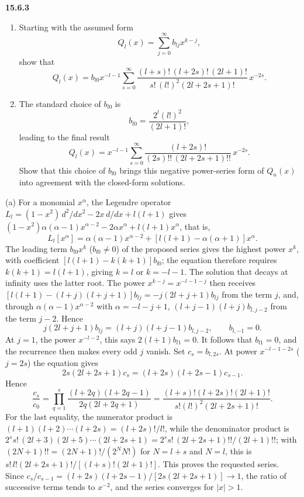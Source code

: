 \par\bigskip
\noindent\textbf{15.6.3}
\begin{enumerate}
\item[(a)]  Starting with the assumed form
\[
Q_{l}(x)=\sum_{j=0}^{\infty}b_{lj}x^{k-j},
\]
show that
\[
Q_{l}(x)=b_{l0}x^{-l-1}\sum_{s=0}^{\infty}
\frac{(l+s)!\,(l+2s)!\,(2l+1)!}{s!\,(l!)^{2}(2l+2s+1)!}\,x^{-2s}.
\]
\item[(b)] The standard choice of $b_{l0}$ is
\[
b_{l0}=\frac{2^{l}(l!)^{2}}{(2l+1)!},
\]
leading to the final result
\[
Q_{l}(x)=x^{-l-1}\sum_{s=0}^{\infty}
\frac{(l+2s)!}{(2s)!!\,(2l+2s+1)!!}\,x^{-2s}.
\]
Show that this choice of $b_{l0}$ brings this negative power-series
form of $Q_{n}(x)$ into agreement with the closed-form solutions.
\end{enumerate}
\solution
(a) For a monomial $x^\alpha$, the Legendre operator
$L_l=(1-x^2)\,d^2/dx^2-2x\,d/dx+l(l+1)$ gives
$(1-x^2)\alpha(\alpha-1)x^{\alpha-2}-2\alpha x^\alpha+l(l+1)x^\alpha$,
that is,
\[
L_l[x^\alpha]=\alpha(\alpha-1)x^{\alpha-2}
+[l(l+1)-\alpha(\alpha+1)]x^\alpha.
\]
The leading term $b_{l0}x^k$ ($b_{l0}\ne0$) of the proposed series
gives the highest power $x^k$, with coefficient
$[l(l+1)-k(k+1)]b_{l0}$; the equation therefore requires
$k(k+1)=l(l+1)$, giving $k=l$ or $k=-l-1$.
The solution that decays at infinity uses the latter root.
The power $x^{k-j}=x^{-l-1-j}$ then receives
$[l(l+1)-(l+j)(l+j+1)]b_{lj}=-j(2l+j+1)b_{lj}$ from the term $j$, and,
through $\alpha(\alpha-1)x^{\alpha-2}$ with $\alpha=-l-j+1$,
$(l+j-1)(l+j)b_{l,j-2}$ from the term $j-2$. Hence
\[
j(2l+j+1)b_{lj}=(l+j)(l+j-1)b_{l,j-2},\qquad b_{l,-1}=0.
\]
At $j=1$, the power $x^{-l-2}$, this says
$2(l+1)b_{l1}=0$.
It follows that $b_{l1}=0$, and the recurrence then makes every
odd $j$ vanish. Set $c_s=b_{l,2s}$.
At power $x^{-l-1-2s}$ ($j=2s$) the equation gives
\[
2s(2l+2s+1)c_s=(l+2s)(l+2s-1)c_{s-1}.
\]
Hence
\[
\frac{c_s}{c_0}
=\prod_{q=1}^s\frac{(l+2q)(l+2q-1)}{2q(2l+2q+1)}
=\frac{(l+s)!(l+2s)!(2l+1)!}
{s!(l!)^2(2l+2s+1)!}.
\]
For the last equality, the numerator product is
$(l+1)(l+2)\cdots(l+2s)=(l+2s)!/l!$,
while the denominator product is
$2^ss!\,(2l+3)(2l+5)\cdots(2l+2s+1)=2^ss!\,(2l+2s+1)!!/(2l+1)!!$;
with $(2N+1)!!=(2N+1)!/(2^NN!)$ for $N=l+s$ and $N=l$, this is
$s!\,l!(2l+2s+1)!/[(l+s)!(2l+1)!]$.
This proves the requested series. Since
$c_s/c_{s-1}=(l+2s)(l+2s-1)/[2s(2l+2s+1)]\to1$, the ratio of
successive terms tends to $x^{-2}$, and the series converges for
$|x|>1$.


